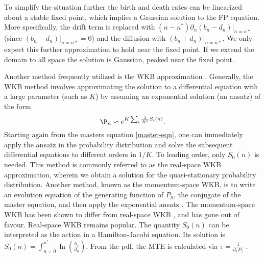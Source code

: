 To simplify the situation further the birth and death rates can be linearized about a stable fixed point, which implies a Gaussian solution to the FP equation. 
More specifically, the drift term is replaced with $(n-n^*)\partial_n(b_n - d_n)|_{n=n*}$ (since $(b_n - d_n)|_{n=n*}=0$) and the diffusion with $(b_n + d_n)|_{n=n*}$. 
We only expect this further approximation to hold near the fixed point. 
If we extend the domain to all space the solution is Gaussian, peaked near the fixed point. 

Another method frequently utilized is the WKB approximation \cite{}.
Generally, the WKB method involves approximating the solution to a differential equation with a large parameter (such as $K$) by assuming an exponential solution (an ansatz) of the form
\begin{equation}
\P_n \backsim e^{K\sum_i \frac{1}{K^i}S_i(n)}.
\label{ansatz}
\end{equation}
Starting again from the masters equation \ref{master-eqn}, one can immediately apply the ansatz in the probability distribution and solve the subsequent differential equations to different orders in $1/K$\cite{Assaf2016,etc}.%
To leading order, only $S_0(n)$ is needed. 
This method is commonly referred to as the real-space WKB approximation, wherein we obtain a solution for the quasi-stationary probability distribution.
Another method, known as the momentum-space WKB, is to write an evolution equation of the generating function of $P_n$, the conjugate of the master equation, and then apply the exponential ansatz \cite{Generating function stuff}.
The momentum-space WKB has been shown to differ from real-space WKB \cite{Ovaskainen?}, and has gone out of favour. 
Real-space WKB remains popular. 
The quantity $S_0(n)$ can be interpreted as the action in a Hamilton-Jacobi equation. 
Its solution is $S_0(n) = \int_{n=0}^{n^*} \ln\left(\frac{b_n}{d_n}\right)$. %
From the pdf, the MTE is calculated via $\tau = \frac{1}{d_1 P_1}$ \cite{Assaf?}. 

